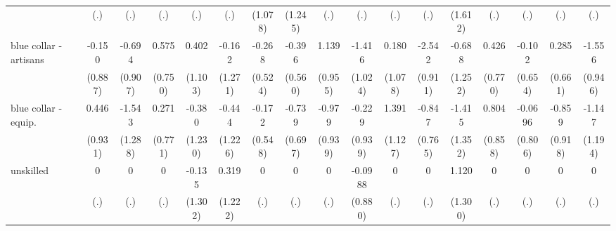 {\begin{tabular}{l*{16}{c}}
                    &         (.)         &         (.)         &         (.)         &         (.)         &         (.)         &     (1.078)         &     (1.245)         &         (.)         &         (.)         &         (.)         &         (.)         &     (1.612)         &         (.)         &         (.)         &         (.)         &         (.)         \\
[1em]
blue collar - artisans&      -0.150         &      -0.694         &       0.575         &       0.402         &      -0.162         &      -0.268         &      -0.396         &       1.139         &      -1.416         &       0.180         &      -2.542\sym{**} &      -0.688         &       0.426         &      -0.102         &       0.285         &      -1.556         \\
                    &     (0.887)         &     (0.907)         &     (0.750)         &     (1.103)         &     (1.271)         &     (0.524)         &     (0.560)         &     (0.955)         &     (1.024)         &     (1.078)         &     (0.911)         &     (1.252)         &     (0.770)         &     (0.654)         &     (0.661)         &     (0.946)         \\
[1em]
blue collar - equip.&       0.446         &      -1.543         &       0.271         &      -0.380         &      -0.444         &      -0.172         &      -0.739         &      -0.979         &      -0.229         &       1.391         &      -0.847         &      -1.415         &       0.804         &     -0.0696         &      -0.859         &      -1.147         \\
                    &     (0.931)         &     (1.288)         &     (0.771)         &     (1.230)         &     (1.226)         &     (0.548)         &     (0.697)         &     (0.939)         &     (0.939)         &     (1.127)         &     (0.765)         &     (1.352)         &     (0.858)         &     (0.806)         &     (0.918)         &     (1.194)         \\
[1em]
unskilled           &           0         &           0         &           0         &      -0.135         &       0.319         &           0         &           0         &           0         &     -0.0988         &           0         &           0         &       1.120         &           0         &           0         &           0         &           0         \\
                    &         (.)         &         (.)         &         (.)         &     (1.302)         &     (1.222)         &         (.)         &         (.)         &         (.)         &     (0.880)         &         (.)         &         (.)         &     (1.300)         &         (.)         &         (.)         &         (.)         &         (.)         \\

\end{tabular}}
